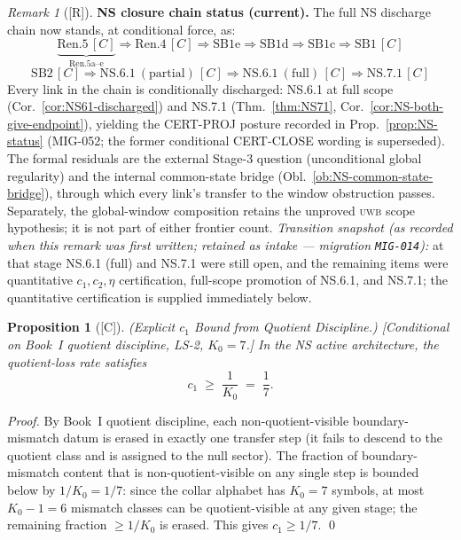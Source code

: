 \documentclass[12pt,oneside]{amsbook}
\theoremstyle{plain}
\newtheorem{proposition}[theorem]{Proposition}
\theoremstyle{definition}
\theoremstyle{remark}
\newtheorem{remark}[theorem]{Remark}
\newcommand{\status}[1]{\textup{[#1]}}
\begin{document}
\begin{remark}[\status{R}]\label{rem:NS-chain-status}
\textbf{NS closure chain status (current).}
The full NS discharge chain now stands, at conditional force, as:
\[
 \underbrace{\mathrm{Ren.5}\,[C]}_{\text{Ren.5a--e}}
 \Rightarrow \mathrm{Ren.4}\,[C]
 \Rightarrow \mathrm{SB1e} \Rightarrow \mathrm{SB1d}
 \Rightarrow \mathrm{SB1c} \Rightarrow \mathrm{SB1}\,[C]
\]
\[
 \mathrm{SB2}\,[C] \Rightarrow \mathrm{NS.6.1\ (partial)}\,[C]
 \Rightarrow \mathrm{NS.6.1\ (full)}\,[C]
 \Rightarrow \mathrm{NS.7.1}\,[C]
\]
Every link in the chain is conditionally discharged: NS.6.1 at full
scope (Cor.~\ref{cor:NS61-discharged}) and NS.7.1
(Thm.~\ref{thm:NS71}, Cor.~\ref{cor:NS-both-give-endpoint}), yielding
the CERT-PROJ posture recorded in
Prop.~\ref{prop:NS-status} (MIG-052; the former conditional
CERT-CLOSE wording is superseded). The formal residuals are the
external Stage-3 question (unconditional global regularity) and the
internal common-state bridge
(Obl.~\ref{ob:NS-common-state-bridge}), through which every link's
transfer to the window obstruction passes. Separately, the
global-window composition retains the unproved \textsc{uwb} scope
hypothesis; it is not part of either frontier count.
\emph{Transition snapshot (as recorded when this remark was first
written; retained as intake --- migration \texttt{MIG-014}):} at that
stage NS.6.1 (full) and NS.7.1 were still open, and the remaining
items were quantitative $c_1,c_2,\eta$ certification, full-scope
promotion of NS.6.1, and NS.7.1; the quantitative certification is
supplied immediately below.
\end{remark}



\begin{proposition}[\status{C}]\label{prop:NS-quantitative-c1}
\textup{(Explicit $c_1$ Bound from Quotient Discipline.)}
\textup{[Conditional on Book~I quotient discipline, LS-2, $K_0=7$.]}
In the NS active architecture, the quotient-loss rate satisfies
\[
 c_1 \;\geq\; \frac{1}{K_0} \;=\; \frac{1}{7}.
\]
\end{proposition}

\begin{proof}
By Book~I quotient discipline, each non-quotient-visible
boundary-mismatch datum is erased in exactly one transfer step
(it fails to descend to the quotient class and is assigned to
the null sector). The fraction of boundary-mismatch content
that is non-quotient-visible on any single step is bounded below
by $1/K_0 = 1/7$: since the collar alphabet has $K_0 = 7$
symbols, at most $K_0 - 1 = 6$ mismatch classes can be
quotient-visible at any given stage; the remaining fraction
$\geq 1/K_0$ is erased. This gives $c_1 \geq 1/7$. \qed
\end{proof}
\end{document}
